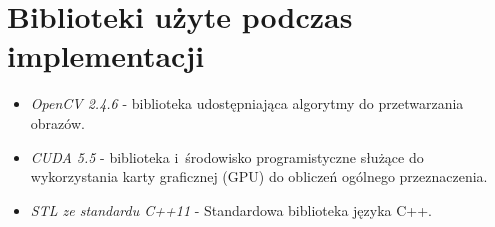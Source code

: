 \chapter{Biblioteki użyte podczas implementacji}
\label{cha:biblioteki}

\begin{itemize}
\item \emph{OpenCV 2.4.6} - biblioteka udostępniająca algorytmy do przetwarzania obrazów.
\item \emph{CUDA 5.5} - biblioteka i~środowisko programistyczne służące do wykorzystania karty graficznej (GPU) do obliczeń ogólnego przeznaczenia.
\item \emph{STL ze standardu C++11} - Standardowa biblioteka języka C++.
\end{itemize}
